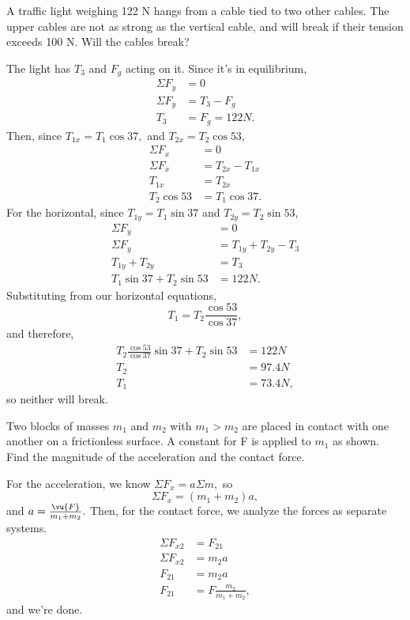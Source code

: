\documentclass[11pt]{article}
\begin{document}
\begin{example}
	A traffic light weighing 122 N hangs from a cable tied to two other cables. The upper cables are not as strong as the vertical cable, and will break if their tension exceeds 100 N. Will the cables break?
\end{example}
\begin{solution}
The light has $T_3$ and $F_g$ acting on it. Since it's in equilibrium,
\begin{align*}
	\Sigma F_y &= 0 \\
	\Sigma F_y &= T_3 - F_g \\
	T_3 &= F_g = 122 N.
\end{align*}
Then, since $T_{1x} = T_1\cos37,$ and $T_{2x} = T_2\cos53,$
\begin{align*}
	\Sigma F_x &= 0 \\
	\Sigma F_x &= T_{2x} - T_{1x} \\
	T_{1x} &= T_{2x} \\
	T_2\cos53 &= T_1\cos37.
\end{align*}
For the horizontal, since $T_{1y} = T_1\sin37$ and $T_{2y} = T_2\sin53$,
\begin{align*}
	\Sigma F_y &= 0 \\
	\Sigma F_y &= T_{1y} + T_{2y} - T_3 \\
	T_{1y} + T_{2y} &= T_3 \\
	T_1\sin37 + T_2\sin53 &= 122 N.
\end{align*}
Substituting from our horizontal equations,
\[T_1 = T_{2}\frac{\cos53}{\cos37},\]
and therefore,
\begin{align*}
	T_{2}\frac{\cos53}{\cos37}\sin37 + T_2\sin53 &= 122 N \\
	T_2 &= 97.4 N \\
	T_1 &= 73.4 N,
\end{align*}
so neither will break.
\end{solution}

\begin{example}
	Two blocks of masses $m_1$ and $m_2$ with $m_1 > m_2$ are placed in contact with one another on a frictionless surface. A constant for F is applied to $m_1$ as shown. Find the magnitude of the acceleration and the contact force.
\end{example}
\begin{solution}
For the acceleration, we know $\Sigma F_{x} = a\Sigma m,$ so
\[\Sigma F_{x} = (m_1+m_2)a,\]
and $a = \frac{\vu{F}}{m_1 + m_2}.$ Then, for the contact force, we analyze the forces as separate systems.
\begin{align*}
	\Sigma F_{x2} &= F_{21} \\
	\Sigma F_{x2} &= m_2a \\
	F_{21} &= m_2a \\
	F_{21} &= F\frac{m_2}{m_1+m_2},
\end{align*}
and we're done.
\end{solution}
\end{document}
